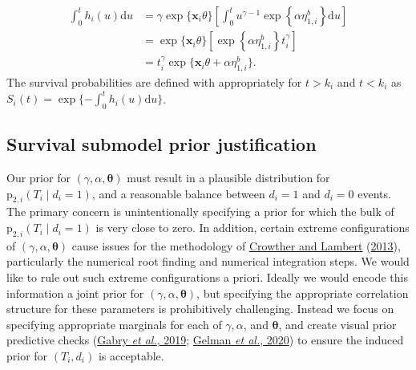 \documentclass[
  10pt,
  a4paper,
]{article}
\newcommand{\pd}{\text{p}}
\begin{document}
\begin{align*}
  \int_{0}^{t} h_{i}(u) \text{d}u
  &= \gamma \exp\{\boldsymbol{x}_{i}\theta\}
    \left[
      \int_{0}^{t}
        u^{\gamma - 1}
        \exp\left\{
          \alpha \eta^{b}_{1, i}
        \right\}
      \text{d}u
    \right] \\
  &= \exp\{\boldsymbol{x}_{i}\theta\}
    \left[
      \exp\left\{
        \alpha \eta^{b}_{1, i}
      \right\}
      t_{i}^{\gamma}
    \right] \\
  &= t_{i}^{\gamma} \exp\{\boldsymbol{x}_{i}\theta + \alpha \eta^{b}_{1, i}\}.
\end{align*} The survival probabilities are defined with appropriately
for \(t > k_{i}\) and \(t < k_{i}\) as
\(S_{i}(t) = \exp\{-\int_{0}^{t} h_{i}(u) \text{d}u\}\).

\hypertarget{p2-prior-justification}{%
\subsection{Survival submodel prior
justification}\label{p2-prior-justification}}

Our prior for \((\gamma, \alpha, \boldsymbol{\theta})\) must result in a
plausible distribution for \(\pd_{2, i}(T_{i} \mid d_{i} = 1)\), and a
reasonable balance between \(d_{i} = 1\) and \(d_{i} = 0\) events. The
primary concern is unintentionally specifying a prior for which the bulk
of \(\pd_{2, i}(T_{i} \mid d_{i} = 1)\) is very close to zero. In
addition, certain extreme configurations of
\((\gamma, \alpha, \boldsymbol{\theta})\) cause issues for the
methodology of \protect\hyperlink{ref-crowther_simulating_2013}{Crowther
and Lambert} (\protect\hyperlink{ref-crowther_simulating_2013}{2013}),
particularly the numerical root finding and numerical integration steps.
We would like to rule out such extreme configurations a priori. Ideally
we would encode this information a joint prior for
\((\gamma, \alpha, \boldsymbol{\theta})\), but specifying the
appropriate correlation structure for these parameters is prohibitively
challenging. Instead we focus on specifying appropriate marginals for
each of \(\gamma, \alpha\), and \(\boldsymbol{\theta}\), and create
visual prior predictive checks
(\protect\hyperlink{ref-gabry_visualization_2019}{Gabry \emph{et al.},
2019}; \protect\hyperlink{ref-gelman_bayesian_2020}{Gelman \emph{et
al.}, 2020}) to ensure the induced prior for \((T_{i}, d_{i})\) is
acceptable.
\end{document}
